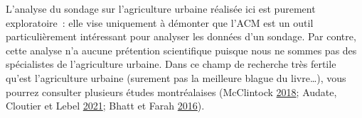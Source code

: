 \documentclass[
  11pt,
  french,
]{book}
\makeatletter
\newenvironment{kframev}{%
\medskip{}
\setlength{\fboxsep}{.8em}
 \def\at@end@of@kframev{}%
 \ifinner\ifhmode%
  \def\at@end@of@kframev{\end{minipage}}%
  \begin{minipage}{\columnwidth}%
 \fi\fi%
 \def\FrameCommand##1{\hskip\@totalleftmargin \hskip-\fboxsep
 \colorbox{shadebluecolor}{##1}\hskip-\fboxsep
     \hskip-\linewidth \hskip-\@totalleftmargin \hskip\columnwidth}%
 \MakeFramed {\advance\hsize-\width
   \@totalleftmargin\z@ \linewidth\hsize
   \@setminipage}}%
 {\par\unskip\endMakeFramed%
 \at@end@of@kframev}
\newenvironment{rmdblock}[1]
  {
  \begin{itemize}
  \renewcommand{\labelitemi}{
    \raisebox{-.7\height}[0pt][0pt]{
      {\setkeys{Gin}{width=3em,keepaspectratio}\texttt{[image: images/\#1]}}
    }
  }
  \setlength{\fboxsep}{1em}
  \begin{kframev}
  \small
  \item
  }
  {
  \end{kframev}
  \end{itemize}
  }
\newenvironment{bloc_attention}
  {\begin{rmdblock}{attention}}
  {\end{rmdblock}}
\makeatother
\begin{document}
\begin{bloc_attention}
L'analyse du sondage sur l'agriculture urbaine réalisée ici est purement exploratoire~: elle vise uniquement à démonter que l'ACM est un outil particulièrement intéressant pour analyser les données d'un sondage. Par contre, cette analyse n'a aucune prétention scientifique puisque nous ne sommes pas des spécialistes de l'agriculture urbaine. Dans ce champ de recherche très fertile qu'est l'agriculture urbaine (surement pas la meilleure blague du livre\ldots), vous pourrez consulter plusieurs études montréalaises (McClintock \protect\hyperlink{ref-mcclintock2018urban}{2018}; Audate, Cloutier et Lebel \protect\hyperlink{ref-audate2021motivations}{2021}; Bhatt et Farah \protect\hyperlink{ref-bhatt2016cultivating}{2016}).

\end{bloc_attention}
\end{document}
